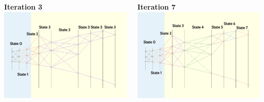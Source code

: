 \documentclass[dvipsnames, aspectratio=43] {beamer}
\begin{document}
\begin{frame}
\begin{columns}[t]
    \begin{block}{\bf \centering Iteration 3}
      \includegraphics[width=1.\linewidth]{TrackingScheme_cells_state3.pdf}
    \end{block}
    \begin{block}{\bf \centering Iteration 7}
      \includegraphics[width=1.\linewidth]{TrackingScheme_cells_state7.pdf}
    \end{block}
  \end{columns}
\end{frame}
\end{document}
